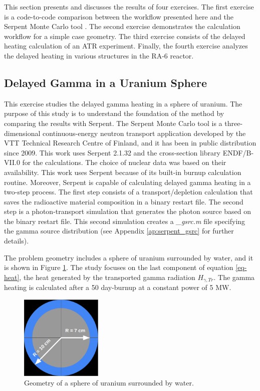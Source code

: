 This section presents and discusses the results of four exercises.
The first exercise is a code-to-code comparison between the workflow presented here and the Serpent Monte Carlo tool \cite{leppanen_serpent_2015}.
The second exercise demonstrates the calculation workflow for a simple case geometry.
The third exercise consists of the delayed heating calculation of an ATR experiment.
Finally, the fourth exercise analyzes the delayed heating in various structures in the RA-6 reactor.


\subsection{Delayed Gamma in a Uranium Sphere}

This exercise studies the delayed gamma heating in a sphere of uranium.
The purpose of this study is to understand the foundation of the method by comparing the results with Serpent.
The Serpent Monte Carlo tool is a three-dimensional continuous-energy neutron transport application developed by the VTT Technical Research Centre of Finland, and it has been in public distribution since 2009.
This work uses Serpent 2.1.32 and the cross-section library ENDF/B-VII.0 for the calculations.
The choice of nuclear data was based on their availability.
This work uses Serpent because of its built-in burnup calculation routine.
Moreover, Serpent is capable of calculating delayed gamma heating in a two-step process.
The first step consists of a transport/depletion calculation that saves the radioactive material composition in a binary restart file.
The second step is a photon-transport simulation that generates the photon source based on the binary restart file.
This second simulation creates a \textit{\_gsrc.m} file specifying the gamma source distribution (see Appendix \ref{ap:serpent_gsrc} for further details).

The problem geometry includes a sphere of uranium surrounded by water, and it is shown in Figure \ref{fig:exp}.
The study focuses on the last component of equation \ref{eq-heat}, the heat generated by the transported gamma radiation $H_{\gamma, Tr}$.
The gamma heating is calculated after a 50 day-burnup at a constant power of 5 MW.

\begin{figure}[htbp!]
  \begin{center}
    \includegraphics[width=0.35\textwidth]{figures/axial-view2}
  \end{center}
  \caption{Geometry of a sphere of uranium surrounded by water.}
  \label{fig:exp}
\end{figure}

